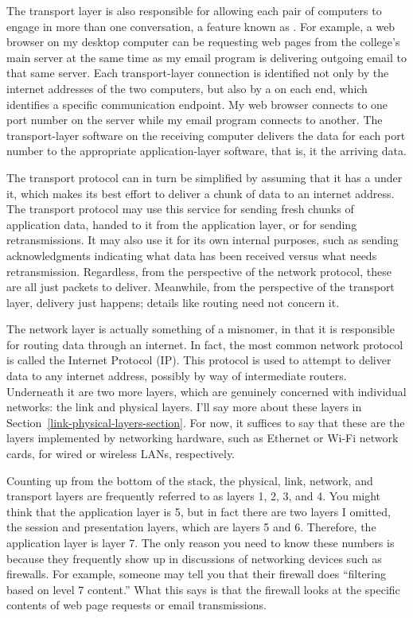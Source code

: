 The transport layer is also responsible for allowing each pair of
computers to engage in more than one conversation, a feature known as
.  For example, a web browser on my desktop
computer can be requesting web pages from the college's main server at
the same time as my email program is delivering outgoing email to that
same server.  Each transport-layer connection is identified not only
by the internet addresses of the two computers, but also by a
 on each end, which identifies a specific
communication endpoint.  My web browser connects to one port
number on the server while my email program connects to another.  The
transport-layer software on the receiving computer delivers the data for each port number to the
appropriate application-layer software, that is, it
 the arriving data.

The transport protocol can in turn be simplified by assuming that it
has a  under it, which makes its best
effort to deliver a chunk of data to an internet address.  The
transport protocol may use this service for sending fresh chunks of
application data, handed to it from the application layer, or for
sending retransmissions.  It may also use it for its own internal
purposes, such as sending acknowledgments indicating what data has
been received versus what needs retransmission.  Regardless, from the
perspective of the network protocol, these are all just
packets to deliver.  Meanwhile, from the perspective of the transport
layer, delivery just happens; details like routing need not concern
it.

The network layer is actually something of a misnomer, in that it is
responsible for routing data through an internet.
In fact, the most common network protocol is called the Internet Protocol (IP).
This protocol is used to attempt to deliver data to
any internet address, possibly by way of intermediate routers.
Underneath it are two
more layers, which are genuinely concerned with individual networks:
the link and physical layers.  I'll say more about these layers in
Section~\ref{link-physical-layers-section}.  For now, it suffices to say that these are the
layers implemented by networking hardware, such as Ethernet or
Wi-Fi network cards, for wired or wireless LANs, respectively.

Counting up from the bottom of the stack, the physical, link, network, and
transport layers are frequently referred to as layers 1, 2, 3, and 4.
You might think that the application layer is 5, but in fact there are
two layers I omitted, the session and presentation layers, which are
layers 5 and 6.  Therefore, the application
layer is layer 7.  The only reason you need to know these numbers is
because they frequently show up in discussions of networking devices such
as firewalls.  For example, someone may tell you that their firewall
does ``filtering based on level 7 content.''  What this says is that
the firewall looks at the specific contents of web page requests or email
transmissions.


